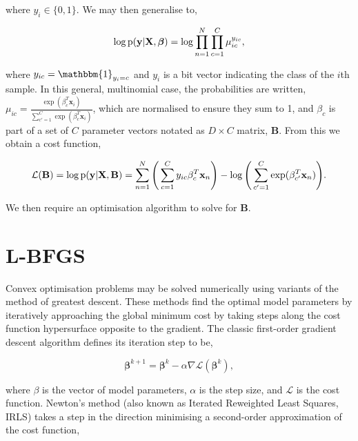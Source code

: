 where $y_i \in \{0, 1\}$. We may then generalise to,

\begin{equation}
\begin{aligned}
\log\text{p}(\mathbf{y}|\mathbf{X}, \boldsymbol\beta) = \log \prod_{n = 1}^N \prod_{c = 1}^C \mu_{ic}^{y_{ic}},
\end{aligned}
\label{eq:multinomial}
\end{equation}

where $y_{ic} = \mathbbm{1}_{y_i = c}$ and $y_i$ is a bit vector indicating the class of the $i$th sample. In this general, multinomial case, the probabilities are written, $\mu_{ic} = \frac{\exp(\beta_c^T\mathbf{x}_i)}{\sum_{c' = 1}^C \exp(\beta_c^T\mathbf{x}_i)}$, which are normalised to ensure they sum to 1, and $\beta_c$ is part of a set of $C$ parameter vectors notated as $D \times C$ matrix, $\mathbf{B}$. From this we obtain a cost function,

\begin{equation}
\mathcal{L}(\mathbf{B}) = 
\log\text{p}(\mathbf{y}|\mathbf{X}, \mathbf{B}) = \sum_{n=1}^N  \Bigg( \sum_{c = 1}^C y_{ic}\beta_c^T \mathbf{x}_n \Bigg) - \log \Bigg( \sum_{c' = 1}^C \exp(\beta_{c'}^T\mathbf{x}_n) \Bigg).
\label{eq:logisticcost}
\end{equation}

We then require an optimisation algorithm to solve for $\mathbf{B}$.

\section{L-BFGS}
\label{sec:lbfgs}

Convex optimisation problems may be solved numerically using variants of the method of greatest descent. These methods find the optimal model parameters by iteratively approaching the global minimum cost by taking steps along the cost function hypersurface opposite to the gradient. The classic first-order gradient descent algorithm defines its iteration step to be,

\begin{equation}
\boldsymbol\beta^{k+1} = \boldsymbol\beta^{k} - \alpha\nabla\mathcal{L}(\boldsymbol\beta^{k}),
\label{eq:gd}
\end{equation}

where $\beta$ is the vector of model parameters, $\alpha$ is the step size, and $\mathcal{L}$ is the cost function. Newton's method (also known as Iterated Reweighted Least Squares, IRLS) takes a step in the direction minimising a second-order approximation of the cost function,

